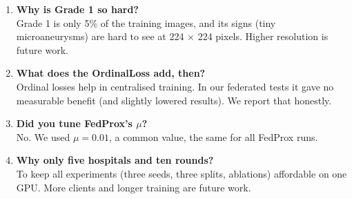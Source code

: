 \documentclass[11pt,a4paper]{article}
\begin{document}
\begin{enumerate}[leftmargin=*,itemsep=6pt]
  report test results.
  \item \textbf{Why is Grade 1 so hard?}\\
  Grade 1 is only 5\% of the training images, and its signs (tiny microaneurysms) are hard to see at
  224 $\times$ 224 pixels. Higher resolution is future work.
  \item \textbf{What does the OrdinalLoss add, then?}\\
  Ordinal losses help in centralised training. In our federated tests it gave no measurable benefit
  (and slightly lowered results). We report that honestly.
  \item \textbf{Did you tune FedProx's $\mu$?}\\
  No. We used $\mu = 0.01$, a common value, the same for all FedProx runs.
  \item \textbf{Why only five hospitals and ten rounds?}\\
  To keep all experiments (three seeds, three splits, ablations) affordable on one GPU. More clients
  and longer training are future work.
\end{enumerate}
\end{document}
